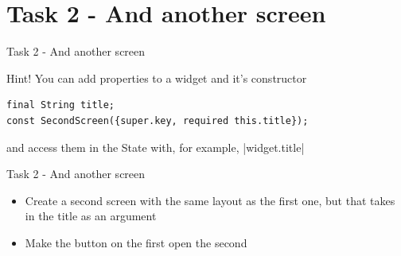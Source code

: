 \section{Task 2 - And another screen}

\begin{frame}[containsverbatim]{Task 2 - And another screen}
    \begin{block}{Hint!}
        You can add properties to a widget and it's constructor

        \begin{verbatim}
final String title;
const SecondScreen({super.key, required this.title});
        \end{verbatim}

        and access them in the State with, for example, |widget.title|
    \end{block}
\end{frame}

\begin{frame}{Task 2 - And another screen}
    \begin{itemize}
        \item Create a second screen with the same layout as the first one, but that takes in the title as an argument
        \item Make the button on the first open the second
    \end{itemize}
\end{frame}

